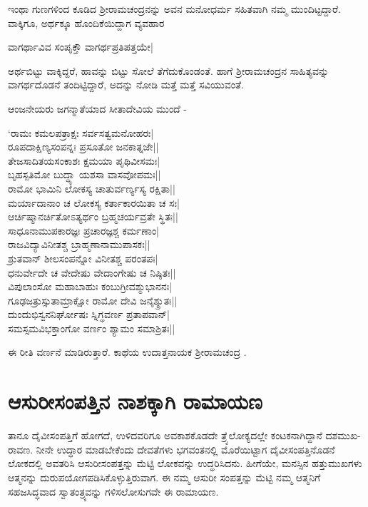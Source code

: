 ಇಂಥಾ ಗುಣಗಳಿಂದ ಕೂಡಿದ ಶ್ರೀರಾಮಚಂದ್ರನನ್ನು ಅವನ ಮನೋಧರ್ಮ ಸಹಿತವಾಗಿ ನಮ್ಮ ಮುಂದಿಟ್ಟದ್ದಾರೆ. ವಾಕ್ಕಿಗೂ, ಅರ್ಥಕ್ಕೂ ಹೊಂದಿಕೆಯಿದ್ದಾಗ ವ್ಯವಹಾರ 

\begin{shloka}
ವಾಗರ್ಥಾವಿವ ಸಂಪೃಕ್ತೌ ವಾಗರ್ಥಪ್ರತಿಪತ್ತಯೇ|
\end{shloka}
ಅರ್ಥಬಿಟ್ಟು ವಾಕ್ಕಿದ್ದರೆ, ಹಾವನ್ನು ಬಿಟ್ಟು ಸೋಲೆ ತೆಗೆದುಕೊಂಡಂತೆ. ಹಾಗೆ ಶ್ರೀರಾಮಚಂದ್ರನ ಸಾಹಿತ್ಯವನ್ನು ವಾಗರ್ಥದೊಡನೆ ತಂದಿಟ್ಟಿದ್ದಾರೆ, ಅದನ್ನು ನೋಡಿ ಮತ್ತೆ ಮತ್ತೆ ಸವಿಯುವಂತೆ.

ಆಂಜನೇಯರು ಜಗನ್ಮಾತೆಯಾದ ಸೀತಾದೇವಿಯ ಮುಂದೆ -

\begin{shloka}
`ರಾಮಃ ಕಮಲಪತ್ರಾಕ್ಷಃ ಸರ್ವಸತ್ವಮನೋಹರಃ|\\
ರೂಪದಾಕ್ಷಿಣ್ಯಸಂಪನ್ನಃ ಪ್ರಸೂತೋ ಜನಕಾತ್ನಜೇ||\\
ತೇಜಸಾದಿತಯಸಂಕಾಶಃ ಕ್ಷಮಯಾ ಪೃಥಿವೀಸಮಃ|\\
ಬೃಹಸ್ಪತಿಮೋ ಬುದ್ಧ್ಯಾ ಯಶಸಾ ವಾಸವೋಪಮಃ||\\
ರಾಮೋ ಭಾಮಿನಿ ಲೋಕಸ್ಯ ಚಾತುರ್ವರ್ಣ್ಯಸ್ಯ ರಕ್ಷಿತಾ||\\
ಮರ್ಯಾದಾನಾಂ ಚ ಲೋಕಸ್ಯ ಕರ್ತಾಕಾರಯಿತಾ ಚ ಸಃ|\\
ಆರ್ಚಿಷ್ಮಾನರ್ಚಿತೋಽತ್ಯರ್ಥಂ ಬ್ರಹ್ಮಚರ್ಯವ್ರತೇ ಸ್ಥಿತಃ||\\
ಸಾಧೂನಾಮುಪಕಾರಜ್ಞಃ ಪ್ರಚಾರಜ್ಞಶ್ಚ ಕರ್ಮಣಾಂ|\\
ರಾಜವಿದ್ಯಾವಿನೀತಶ್ಚ ಬ್ರಾಹ್ಮಣಾನಾಮುಪಾಸಕಃ||\\
ಶ್ರುತವಾನ್ ಶೀಲಸಂಪನ್ನೋ ವಿನೀತಶ್ಚ ಪರಂತಪಃ|\\
ಧನುರ್ವೇದೇ ಚ ವೇದೇಷು ವೇದಾಂಗೇಷು ಚ ನಿಷ್ಠಿತಃ||\\
ವಿಪುಲಾಂಸೋ ಮಹಾಬಾಹುಃ ಕಂಬುಗ್ರೀವಶ್ಮುಭಾನನಃ|\\
ಗೂಢಜತ್ರುಸ್ಸುತಾಮ್ರಾಕ್ಷೋ ರಾಮೋ ದೇವಿ ಜನೈಶ್ಶ್ರುತಃ||\\
ದುಂದುಭಿಸ್ವನನಿರ್ಘೋಷಃ ಸ್ನಿಗ್ಧವರ್ಣ ಪ್ರತಾಪವಾನ್|\\
ಸಮಸ್ಸಮವಿಭಕ್ತಾಂಗೋ ವರ್ಣಂ ಶ್ಯಾಮಂ ಸಮಾಶ್ರಿತಃ||
\end{shloka}
ಈ ರೀತಿ ವರ್ಣನೆ ಮಾಡಿರುತ್ತಾರೆ. ಕಾಥೆಯ ಉದಾತ್ತನಾಯಕ ಶ್ರೀರಾಮಚಂದ್ರ .

\section*{ಆಸುರೀಸಂಪತ್ತಿನ ನಾಶಕ್ಕಾಗಿ ರಾಮಾಯಣ}

ತಾನೂ ದೈವೀಸಂಪತ್ತಿಗೆ ಹೋಗದೆ, ಉಳಿದವರಿಗೂ ಅವಕಾಶಕೊಡದೇ ತ್ರ್ಯೆಲೋಕ್ಯದಲ್ಲೇ ಕಂಟಕನಾಗಿದ್ದಾನೆ ದಶಮುಖ-ರಾವಣ. ನೀನೇ ಉದ್ಧಾರ ಮಾಡಬೇಕೆಂದು ದೇವತೆಗಳು ಭಗವಂತನಲ್ಲಿ ಮೊರೆಯಿಟ್ಟಾಗ ದೈವೀಸಂಪತ್ತಿನೊಡನೆ ಲೋಕದಲ್ಲಿ ಅವತರಿಸಿ ಆಸುರೀಸಂಪತ್ತನ್ನು ಮೆಟ್ಟಿ ಲೋಕವನ್ನು ಉದ್ಧರಿಸಿದನು. ಹೀಗೆಯೇ, ಮನಸ್ಸಿನ ಹತ್ತುಮುಖಗಳು ಆತ್ಮನನ್ನು ದುರುಪಯೋಗಪಡಿಸಿಕೊಳ್ಳುತ್ತಿರುವಾಗ. ಈ ನಮ್ಮ ಆಸುರೀ ಸಂಪತ್ತನ್ನು ಮೆಟ್ಟಿ ನಮ್ಮ ಆತ್ಮನಿಗೆ ಸಹಜಸಿದ್ಧವಾದ ಸ್ವಾತಂತ್ರ್ಯವನ್ನು ಗಳಿಸಲೋಸುಗವೇ ಈ ರಾಮಾಯಣ.


